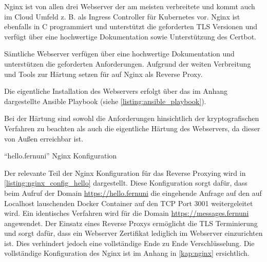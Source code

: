 Nginx ist von allen drei Webserver der am meisten verbreitete und kommt auch im Cloud Umfeld z. B. als Ingress Controller für Kubernetes vor. Nginx ist ebenfalls in C programmiert und unterstützt die geforderten \ac{TLS} Versionen und verfügt über eine hochwertige Dokumentation sowie Unterstützung des Certbot.

Sämtliche Webserver verfügen über eine hochwertige Dokumentation und unterstützen die geforderten Anforderungen. Aufgrund der weiten Verbreitung und Tools zur Härtung setzen für auf Nginx als Reverse Proxy.

Die eigentliche Installation des Webservers erfolgt über das im Anhang dargestellte Ansible Playbook (siehe \autoref{listing:ansible_playbook}).

Bei der Härtung sind sowohl die Anforderungen hinsichtlich der kryptografischen Verfahren zu beachten als auch die eigentliche Härtung des Webservers, da dieser von Außen erreichbar ist.




\begin{listing}[ht]
    \caption{\enquote{hello.fernuni} Nginx Konfiguration}
    \label{listing:nginx_config_hello}
\end{listing}

Der relevante Teil der Nginx Konfiguration für das Reverse Proxying wird in \autoref{listing:nginx_config_hello} dargestellt. Diese Konfiguration sorgt dafür, dass beim Aufruf der Domain \url{https://hello.fernuni} die eingehende Anfrage auf den auf Localhost lauschenden Docker Container auf den \ac{TCP} Port 3001 weitergeleitet wird. Ein identisches Verfahren wird für die Domain \url{https://messages.fernuni} angewendet. Der Einsatz eines Reverse Proxys ermöglicht die TLS Terminierung und sorgt dafür, dass ein Webserver Zertifikat lediglich im Webserver einzurichten ist. Dies verhindert jedoch eine vollständige Ende zu Ende Verschlüsselung. Die vollständige Konfiguration des Nginx ist im Anhang in \autoref{kap:nginx} ersichtlich.

